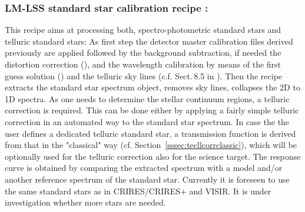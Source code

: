 \subsubsection{LM-LSS standard star calibration recipe :}\label{rec:lsslmstd}
This recipe aims at processing both, spectro-photometric standard stars and telluric standard stars: As first step the detector master calibration files derived previously are applied followed by the background subtraction, if needed the distortion correction (\hyperref[dataitem:lmlssdistsol]{}), and
the wavelength calibration by means of the first guess solution (\hyperref[dataitem:lmlsswaveguess]{}) and the telluric sky lines (c.f. Sect.\,8.5 in \cite{DRLS}). Then the recipe extracts the standard star spectrum object, removes sky lines, collapses the 2D to 1D spectra. As one needs to determine the stellar continuum regions, a telluric correction is required. This can be done either by applying a fairly simple telluric correction in an automated way to the standard star spectrum. In case the the user defines a dedicated telluric standard star, a transmission function is derived from that in the "classical" way (cf. Section~\ref{sssec:tecllcorrclassic}), which will be optionally used for the telluric correction also for the science target. The response curve is obtained by comparing the extracted spectrum with a model and/or another reference spectrum of the standard star. Currently it is foreseen to use the same standard stars as in \ac{CRIRES}/CRIRES+ and \ac{VISIR}. It is under investigation whether more stars are needed.
